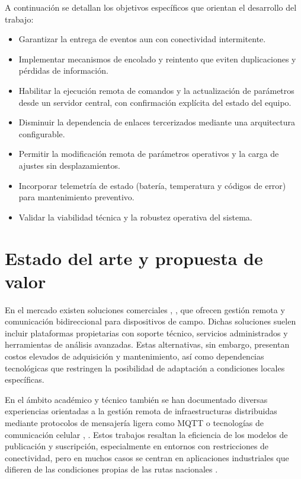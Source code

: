 A continuación se detallan los objetivos específicos que orientan el desarrollo del trabajo:
\begin{itemize}

\item  Garantizar la entrega de eventos aun con conectividad intermitente.

\item Implementar mecanismos de encolado y reintento que eviten duplicaciones y pérdidas de información.

\item  Habilitar la ejecución remota de comandos y la actualización de parámetros desde un servidor central, con confirmación explícita del estado del equipo.

\item  Disminuir la dependencia de enlaces tercerizados mediante una arquitectura configurable.

\item  Permitir la modificación remota de parámetros operativos y la carga de ajustes sin desplazamientos.

\item Incorporar telemetría de estado (batería, temperatura y códigos de error) para mantenimiento preventivo.

\item Validar la viabilidad técnica y la robustez operativa del sistema.
\end{itemize}


\section{Estado del arte y propuesta de valor}

En el mercado existen soluciones comerciales \cite{exemys}, \cite{digiRemoteManager}, que ofrecen gestión remota y comunicación bidireccional para dispositivos de campo. Dichas soluciones suelen incluir plataformas propietarias con soporte técnico, servicios administrados y herramientas de análisis avanzadas. Estas alternativas, sin embargo, presentan costos elevados de adquisición y mantenimiento, así como dependencias tecnológicas que restringen la posibilidad de adaptación a condiciones locales específicas.

En el ámbito académico y técnico también se han documentado diversas experiencias orientadas a la gestión remota de infraestructuras distribuidas mediante protocolos de mensajería ligera como MQTT o tecnologías de comunicación celular \cite{monitoringVehicles2023}, \cite{iotSmartTraffic2021}. Estos trabajos resaltan la eficiencia de los modelos de publicación y suscripción, especialmente en entornos con restricciones de conectividad, pero en muchos casos se centran en aplicaciones industriales que difieren de las condiciones propias de las rutas nacionales \cite{iopMQTTSystem2023}.

